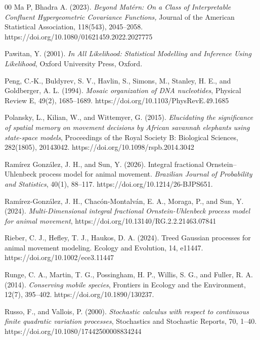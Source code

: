 \documentclass[preprint,12pt,authoryear]{elsarticle}
\begin{document}
\begin{thebibliography}{00}
Ma P, Bhadra A. (2023).
\textit{Beyond Mat\'ern: On a Class of Interpretable Confluent Hypergeometric Covariance Functions,}
Journal of the American Statistical Association, 118(543), 2045--2058.
https://doi.org/10.1080/01621459.2022.2027775

Pawitan, Y. (2001).
\textit{In All Likelihood: Statistical Modelling and Inference Using Likelihood},
Oxford University Press, Oxford.

  Peng, C.-K., Buldyrev, S. V., Havlin, S., Simons, M., Stanley, H. E., and Goldberger, A. L. (1994).
  \textit{Mosaic organization of DNA nucleotides},
  Physical Review E,
  49(2),
  1685--1689. https://doi.org/10.1103/PhysRevE.49.1685

  Polansky, L., Kilian, W., and Wittemyer, G. (2015).
  \textit{Elucidating the significance of spatial memory on movement decisions by African savannah elephants using state-space models},
  Proceedings of the Royal Society B: Biological Sciences,
  282(1805),
  20143042.
 https://doi.org/10.1098/rspb.2014.3042

Ramírez González, J. H., and Sun, Y. (2026).
Integral fractional Ornstein--Uhlenbeck process model for animal movement.
\textit{Brazilian Journal of Probability and Statistics}, 40(1), 88--117.
https://doi.org/10.1214/26-BJPS651.

  Ramírez-González, J. H., Chacón-Montalván, E. A., Moraga, P., and Sun, Y. (2024).
  \textit{Multi-Dimensional integral fractional Ornstein-Uhlenbeck process model for animal movement},
    https://doi.org/10.13140/RG.2.2.21463.07841

Rieber, C. J., Hefley, T. J.,  Haukos, D. A. (2024). Treed Gaussian processes for animal movement modeling. Ecology and Evolution, 14, e11447. https://doi.org/10.1002/ece3.11447

  Runge, C. A., Martin, T. G., Possingham, H. P., Willis, S. G., and Fuller, R. A. (2014).
  \textit{Conserving mobile species},
  Frontiers in Ecology and the Environment,
  12(7),
  395--402.
  https://doi.org/10.1890/130237.

  Russo, F., and Vallois, P. (2000).
  \textit{Stochastic calculus with respect to continuous finite quadratic variation processes},
  Stochastics and Stochastic Reports,
  70,
  1–40. https://doi.org/10.1080/17442500008834244


\end{thebibliography}
\end{document}
